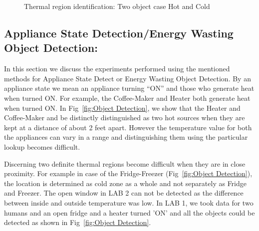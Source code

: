 
 \begin{figure}[!htp]
\begin{minipage}{0.00\textwidth}
\mbox{}
\end{minipage}
\begin{minipage}{0.48\textwidth}
\begin{center}
\scriptsize{
}
\caption{Thermal region identification: Two object case Hot and Cold}
\label{algo:Two Object}
  \end{center}
  \end{minipage}
\end{figure}

    \subsection{Appliance State Detection/Energy Wasting Object Detection:} In this section we discuss the experiments performed using the mentioned methods for Appliance State Detect or Energy Wasting Object Detection. By an appliance state we mean an appliance turning ``ON'' and those who generate heat when turned ON. For example, the  Coffee-Maker and Heater both generate heat when turned ON. In Fig~\ref{fig:Object Detection}, we show that the Heater and Coffee-Maker and be distinctly distinguished as two hot sources when they are kept at a distance of about 2 feet apart. However the temperature value for both the appliances can vary in a range and distinguishing them using the particular lookup becomes difficult. 
    
   Discerning two definite thermal regions become difficult when they are in close proximity. For example in case of the Fridge-Freezer (Fig~\ref{fig:Object Detection}), the location is determined as cold zone as a whole and not separately as Fridge and Freezer. The open window in LAB 2 can not be detected as the difference between inside and outside temperature was low. In LAB 1, we took data for two humans and an open fridge and a heater turned 'ON' and all the objects could be detected as shown in Fig~\ref{fig:Object Detection}.
   
